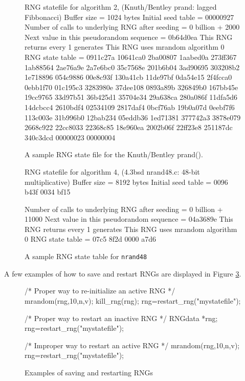 \begin{figure}
\begin{example}
RNG statefile for algorithm 2, (Knuth/Bentley prand: lagged Fibbonacci)
Buffer size = 1024 bytes
Initial seed table =
   00000927
Number of calls to underlying RNG after seeding = 0 billion + 2000
Next value in this pseudorandom sequence = 0b64d0ea
This RNG returns every 1 generates
This RNG uses mrandom algorithm 0
RNG state table =
   0911c27a 10641ca0 2ba00807 1aabed0a
   273ff367 1ab88564 2ae76a9e 2a7e6bc0
   35c7568e 201b6b04 3ad90695 303208b2
   1e718896 054c9886 00e8c93f 130a41cb
   11de97bf 0da54e15 2f4fcca0 0ebb1f70
   01c195c3 3283980e 37dee108 0893a89b
   326849b0 167bb45e 19cc9765 33d97b51
   36b425d1 35704e34 29a638ca 280a086f
   11dfa5d6 14dcbcc4 2610bdf4 02534109
   2817daf4 0bcf76ab 19b0a07d 0eebf7f6
   113c003e 31b996b0 12bab234 05eddb36
   1ed71381 377742a3 3878e079 2668c922
   22cc8033 22368c85 18e960ea 2002b06f
   22ff23e8 251187dc 340c3dcd 00000023
   00000004
\end{example}
\caption{A sample RNG state file for the Knuth/Bentley prand().}
\label{fig:samplestatefile1}
\end{figure}

\begin{figure}
\begin{example}
RNG statefile for algorithm 4, (4.3bsd nrand48.c: 48-bit multiplicative)
Buffer size = 8192 bytes
Initial seed table =
   0096   b43f   0034   bf15

Number of calls to underlying RNG after seeding = 0 billion + 11000
Next value in this pseudorandom sequence = 04a3689e
This RNG returns every 1 generates
This RNG uses mrandom algorithm 0
RNG state table =
   07c5   8f2d   0000   a7d6
\end{example}
\caption{A sample RNG state table for {\tt nrand48}}
\label{fig:samplestatefile2}
\end{figure}

A few examples of how to save and restart RNGs are displayed in Figure
\ref{fig:saverestart}.

\begin{figure}
\begin{example}
/* Proper way to re-initialize an active RNG */
mrandom(rng,10,n,v);
kill_rng(rng);
rng=restart_rng("mystatefile");

/* Proper way to restart an inactive RNG */
RNGdata *rng;
rng=restart_rng("mystatefile");

/* Improper way to restart an active RNG */
mrandom(rng,10,n,v);
rng=restart_rng("mystatefile");
\end{example}
\caption{Examples of saving and restarting RNGs}
\label{fig:saverestart}
\end{figure}

